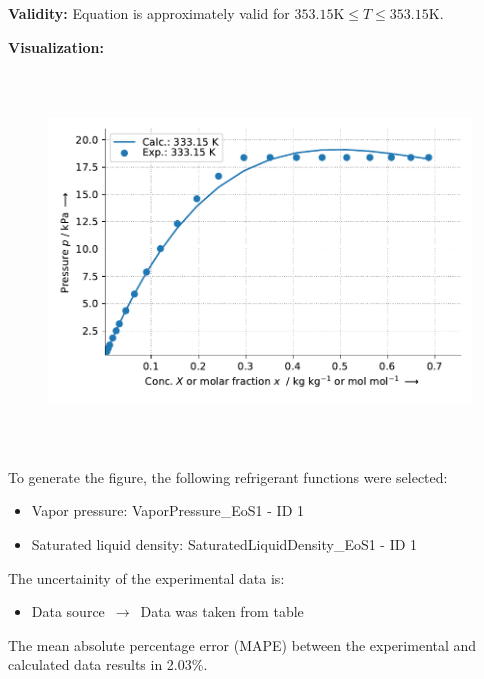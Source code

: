 \textbf{Validity:}
\newline
Equation is approximately valid for $353.15 \si{\kelvin} \leq T \leq 353.15 \si{\kelvin}$.
\newline

\textbf{Visualization:}
%
\begin{figure}[!htp]
{\noindent\includegraphics[height=10cm, keepaspectratio]{figs/abs/abs_Toluene_inoic_liquid_[C2H5NH]+[C2H5OC2H4OSO3]-_NrtlTemperatureDg_1.pdf}}
\end{figure}
%

To generate the figure, the following refrigerant functions were selected:
\begin{itemize}
\item Vapor pressure: VaporPressure\_EoS1 - ID 1
\item Saturated liquid density: SaturatedLiquidDensity\_EoS1 - ID 1
\end{itemize}

The uncertainity of the experimental data is:
\begin{itemize}
\item Data source $\,\to\,$ Data was taken from table
\end{itemize}

The mean absolute percentage error (MAPE) between the experimental and calculated data results in 2.03\%.
\FloatBarrier
\newpage
